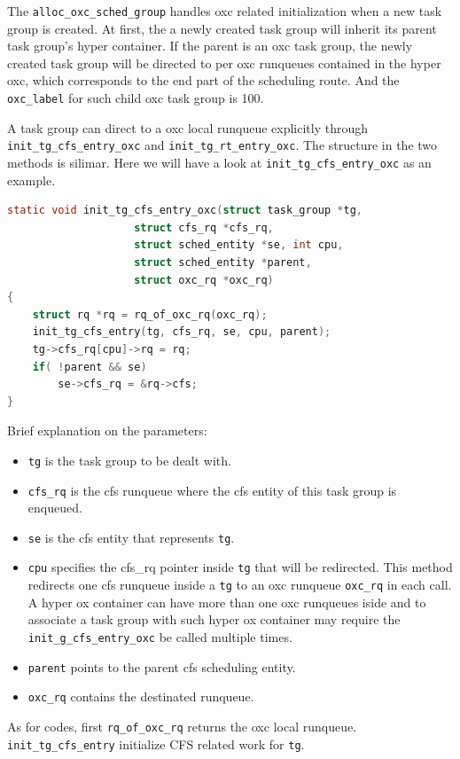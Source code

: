 The \texttt{alloc\_oxc\_sched\_group} handles oxc related initialization when a 
new task group is created. At first, the a newly created task group will inherit
its parent task group's hyper container. If the parent is an oxc task group, the
newly created task group will be directed to per oxc runqueues contained in the
hyper oxc, which corresponds to the end part of the scheduling route.  And 
the \texttt{oxc\_label} for such child oxc task group is 100.

A task group can direct to a oxc local runqueue explicitly through 
\texttt{init\_tg\_cfs\_entry\_oxc} and \texttt{init\_tg\_rt\_entry\_oxc}.
The structure in the two methods is silimar. Here we will have a look at 
\texttt{init\_tg\_cfs\_entry\_oxc} as an example.
\begin{lstlisting}[language=C, caption={To explicitlt direct a task group 
						to an OXC local runqueue}]
static void init_tg_cfs_entry_oxc(struct task_group *tg,
					struct cfs_rq *cfs_rq,
					struct sched_entity *se, int cpu,
					struct sched_entity *parent,
					struct oxc_rq *oxc_rq)
{
	struct rq *rq = rq_of_oxc_rq(oxc_rq);
	init_tg_cfs_entry(tg, cfs_rq, se, cpu, parent);
	tg->cfs_rq[cpu]->rq = rq;
	if( !parent && se)
		se->cfs_rq = &rq->cfs;
} 
\end{lstlisting}
Brief explanation on the parameters:
\begin{itemize}
\item \texttt{tg} is the task group to be dealt with.
\item \texttt{cfs\_rq} is the cfs runqueue where the cfs entity of this 
		task group is enqueued. 
\item \texttt{se} is the cfs entity that represents \texttt{tg}.
\item \texttt{cpu} specifies the cfs\_rq pointer inside \texttt{tg} that
		will be redirected.
		This method redirects one cfs runqueue inside a \texttt{tg} 
		to an oxc runqueue \texttt{oxc\_rq} in each call. A hyper ox 
		container can have more than one oxc runqueues iside
		and to associate a task group with such hyper ox container 
		may require the \texttt{init\_g\_cfs\_entry\_oxc} be called 
		multiple times.
\item \texttt{parent} points to the parent cfs scheduling entity.
\item \texttt{oxc\_rq} contains the destinated runqueue. 
\end{itemize}
As for codes, first \texttt{rq\_of\_oxc\_rq} returns the oxc local runqueue.
\texttt{init\_tg\_cfs\_entry} initialize CFS related work for \texttt{tg}.
